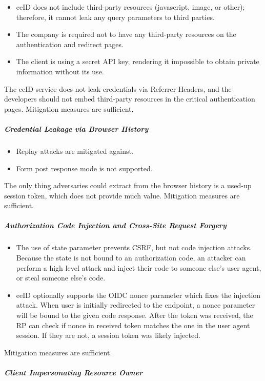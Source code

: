 \begin{itemize}
  \item eeID does not include third-party resources (javascript, image, or other); therefore, it cannot leak any query parameters to third parties.
  \item The company is required not to have any third-party resources on the authentication and redirect pages.
  \item The client is using a secret API key, rendering it impossible to obtain private information without its use.
\end{itemize}

The eeID service does not leak credentials via Referrer Headers, and the developers should not embed third-party resources in the critical authentication pages. Mitigation measures are sufficient.

\subparagraph{Credential Leakage via Browser History}

\begin{itemize}
  \item Replay attacks are mitigated against.
  \item Form post response mode is not supported.
\end{itemize}

The only thing adversaries could extract from the browser history is a used-up session token, which does not provide much value. Mitigation measures are sufficient.

\subparagraph{Authorization Code Injection and Cross-Site Request Forgery}

\begin{itemize}
  \item The use of state parameter prevents CSRF, but not code injection attacks. Because the state is not bound to an authorization code, an attacker can perform a high level attack and inject their code to someone else's user agent, or steal someone else's code.
  \item eeID optionally supports the OIDC nonce parameter which fixes the injection attack. When user is initially redirected to the endpoint, a nonce parameter will be bound to the given code response. After the token was received, the RP can check if nonce in received token matches the one in the user agent session. If they are not, a session token was likely injected.
\end{itemize}

Mitigation measures are sufficient.

\subparagraph{Client Impersonating Resource Owner}


